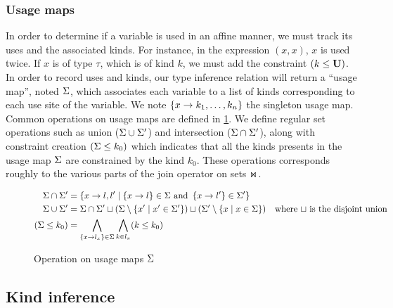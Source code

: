 


\subsubsection{Usage maps}

In order to determine if a variable is used in an affine manner, we must track
its uses and the associated kinds. For instance, in the expression
$(x,x)$, $x$ is used twice. If $x$ is of type $\tau$, which is of kind $k$,
we must add the constraint $(k \leq \mathbf{U})$. In order to record uses and kinds,
our type inference relation will return a ``usage map'', noted $\Sigma$,
which associates each variable to a list of kinds corresponding to each use site
of the variable.
We note $\left\{x \to k_1,\dots,k_n\right\}$ the singleton usage map.
Common operations on usage maps are defined in \cref{op:usgmap}. We define
regular set operations such as union
($\Sigma\cup\Sigma'$) and intersection ($\Sigma\cap\Sigma'$), along
with constraint creation $(\Sigma \leq k_0)$ which indicates that all the kinds
presents in the usage map $\Sigma$ are constrained by the kind $k_0$.
These operations corresponds roughly to the various parts of the join
operator on sets $\operatorname{\Join}$.

\begin{figure}[tp]\centering
\begin{align*}
  \Sigma\cap\Sigma'
  &= \left\{ x \to l,l'
    \mid \left\{x \to l\right\}\in\Sigma \text{ and } \left\{x \to l'\right\}\in\Sigma' \right\} \\
  \Sigma\cup\Sigma'
  &= \Sigma\cap\Sigma' \sqcup
    (\Sigma\setminus \{x' \mid x'\in\Sigma'\}) \sqcup
    (\Sigma'\setminus \{x \mid x\in\Sigma\})
  &\text{where $\sqcup$ is the disjoint union}\\
  (\Sigma \leq k_0)
  &= \bigwedge_{\left\{x \to l_x\right\}\in\Sigma} \bigwedge_{k\in l_x} (k \leq k_0)
\end{align*}
\caption{Operation on usage maps $\Sigma$}
\label{op:usgmap}
\end{figure}

\subsection{Kind inference}

